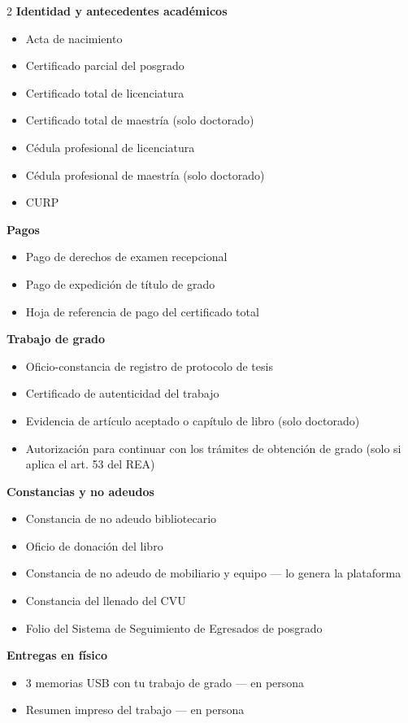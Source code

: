 \begin{multicols}{2}\small
\textbf{Identidad y antecedentes académicos}
\begin{itemize}
  \item Acta de nacimiento
  \item Certificado parcial del posgrado
  \item Certificado total de licenciatura
  \item Certificado total de maestría (solo doctorado)
  \item Cédula profesional de licenciatura
  \item Cédula profesional de maestría (solo doctorado)
  \item CURP
\end{itemize}
\textbf{Pagos}
\begin{itemize}
  \item Pago de derechos de examen recepcional
  \item Pago de expedición de título de grado
  \item Hoja de referencia de pago del certificado total
\end{itemize}
\textbf{Trabajo de grado}
\begin{itemize}
  \item Oficio-constancia de registro de protocolo de tesis
  \item Certificado de autenticidad del trabajo
  \item Evidencia de artículo aceptado o capítulo de libro (solo doctorado)
  \item Autorización para continuar con los trámites de obtención de grado (solo si aplica el art. 53 del REA)
\end{itemize}
\textbf{Constancias y no adeudos}
\begin{itemize}
  \item Constancia de no adeudo bibliotecario
  \item Oficio de donación del libro
  \item Constancia de no adeudo de mobiliario y equipo — lo genera la plataforma
  \item Constancia del llenado del CVU
  \item Folio del Sistema de Seguimiento de Egresados de posgrado
\end{itemize}
\textbf{Entregas en físico}
\begin{itemize}
  \item 3 memorias USB con tu trabajo de grado — en persona
  \item Resumen impreso del trabajo — en persona

\end{itemize}
\end{multicols}
